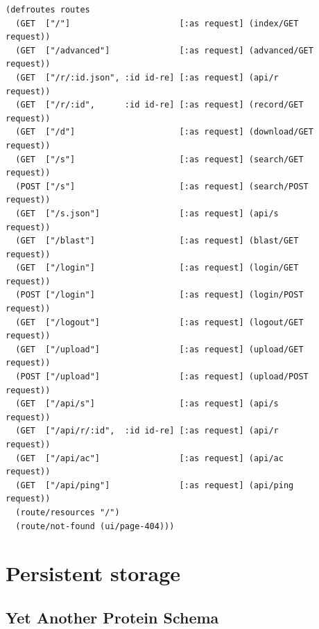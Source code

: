 \lstset{language=Clojure}
\begin{lstlisting}[label=lst:router,caption={%
      [Application ring handler routes]
      Application ring handler routes, taken from \texttt{middleware.clj}.}]
(defroutes routes
  (GET  ["/"]                      [:as request] (index/GET       request))
  (GET  ["/advanced"]              [:as request] (advanced/GET    request))
  (GET  ["/r/:id.json", :id id-re] [:as request] (api/r           request))
  (GET  ["/r/:id",      :id id-re] [:as request] (record/GET      request))
  (GET  ["/d"]                     [:as request] (download/GET    request))
  (GET  ["/s"]                     [:as request] (search/GET      request))
  (POST ["/s"]                     [:as request] (search/POST     request))
  (GET  ["/s.json"]                [:as request] (api/s           request))
  (GET  ["/blast"]                 [:as request] (blast/GET       request))
  (GET  ["/login"]                 [:as request] (login/GET       request))
  (POST ["/login"]                 [:as request] (login/POST      request))
  (GET  ["/logout"]                [:as request] (logout/GET      request))
  (GET  ["/upload"]                [:as request] (upload/GET      request))
  (POST ["/upload"]                [:as request] (upload/POST     request))
  (GET  ["/api/s"]                 [:as request] (api/s           request))
  (GET  ["/api/r/:id",  :id id-re] [:as request] (api/r           request))
  (GET  ["/api/ac"]                [:as request] (api/ac          request))
  (GET  ["/api/ping"]              [:as request] (api/ping        request))
  (route/resources "/")
  (route/not-found (ui/page-404)))
\end{lstlisting}


\section{Persistent storage}


\subsection{Yet Another Protein Schema}


